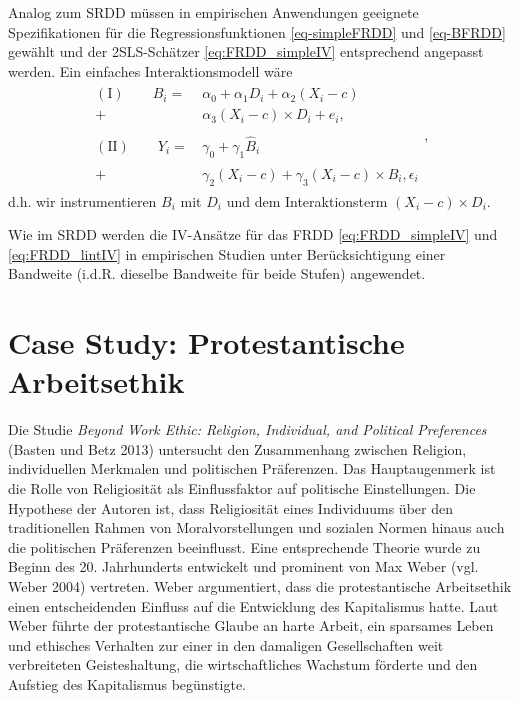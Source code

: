 \documentclass[
  a4paper,
  DIV=11,
  oneside]{scrreprt}
\begin{document}
Analog zum SRDD müssen in empirischen Anwendungen geeignete
Spezifikationen für die Regressionsfunktionen \eqref{eq-simpleFRDD} und
\eqref{eq-BFRDD} gewählt und der 2SLS-Schätzer \eqref{eq:FRDD_simpleIV}
entsprechend angepasst werden. Ein einfaches Interaktionsmodell wäre
\begin{align}
  \begin{split}
  (\mathrm{I})\qquad B_i =&\, \alpha_0 + \alpha_1 D_i + \alpha_2 (X_i - c)\\ 
  +&\, \alpha_3 (X_i - c) \times D_i + e_i,\\
  \\
  (\mathrm{II})\qquad Y_i =&\, \gamma_0 + \gamma_1 \widehat{B}_i\\
  +&\, \gamma_2 (X_i - c) + \gamma_3 (X_i-c)\times\widehat{B}_i, \epsilon_i
  \end{split},\label{eq:FRDD_lintIV}
\end{align} d.h. wir instrumentieren \(B_i\) mit \(D_i\) und dem
Interaktionsterm \((X_i-c)\times D_i\).

Wie im SRDD werden die IV-Ansätze für das FRDD \eqref{eq:FRDD_simpleIV}
und \eqref{eq:FRDD_lintIV} in empirischen Studien unter Berücksichtigung
einer Bandweite (i.d.R. dieselbe Bandweite für beide Stufen) angewendet.

\hypertarget{case-study-protestantische-arbeitsethik}{%
\section{Case Study: Protestantische
Arbeitsethik}\label{case-study-protestantische-arbeitsethik}}

Die Studie \emph{Beyond Work Ethic: Religion, Individual, and Political
Preferences} (Basten und Betz 2013) untersucht den Zusammenhang zwischen
Religion, individuellen Merkmalen und politischen Präferenzen. Das
Hauptaugenmerk ist die Rolle von Religiosität als Einflussfaktor auf
politische Einstellungen. Die Hypothese der Autoren ist, dass
Religiosität eines Individuums über den traditionellen Rahmen von
Moralvorstellungen und sozialen Normen hinaus auch die politischen
Präferenzen beeinflusst. Eine entsprechende Theorie wurde zu Beginn des
20. Jahrhunderts entwickelt und prominent von Max Weber (vgl. Weber
2004) vertreten. Weber argumentiert, dass die protestantische
Arbeitsethik einen entscheidenden Einfluss auf die Entwicklung des
Kapitalismus hatte. Laut Weber führte der protestantische Glaube an
harte Arbeit, ein sparsames Leben und ethisches Verhalten zur einer in
den damaligen Gesellschaften weit verbreiteten Geisteshaltung, die
wirtschaftliches Wachstum förderte und den Aufstieg des Kapitalismus
begünstigte.
\end{document}
